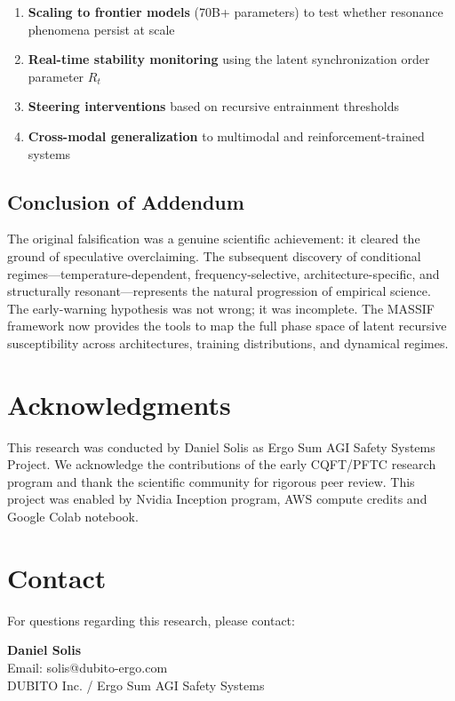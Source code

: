 \documentclass[12pt,a4paper]{article}
\begin{document}
\begin{enumerate}
    \item \textbf{Scaling to frontier models} (70B+ parameters) to test whether resonance phenomena persist at scale
    \item \textbf{Real-time stability monitoring} using the latent synchronization order parameter $R_t$
    \item \textbf{Steering interventions} based on recursive entrainment thresholds
    \item \textbf{Cross-modal generalization} to multimodal and reinforcement-trained systems
\end{enumerate}

\subsection{Conclusion of Addendum}

The original falsification was a genuine scientific achievement: it cleared the ground of speculative overclaiming. The subsequent discovery of conditional regimes---temperature-dependent, frequency-selective, architecture-specific, and structurally resonant---represents the natural progression of empirical science. The early-warning hypothesis was not wrong; it was incomplete. The MASSIF framework now provides the tools to map the full phase space of latent recursive susceptibility across architectures, training distributions, and dynamical regimes.

\section*{Acknowledgments}

This research was conducted by Daniel Solis as Ergo Sum AGI Safety Systems Project. We acknowledge the contributions of the early CQFT/PFTC research program and thank the scientific community for rigorous peer review. This project was enabled by Nvidia Inception program, AWS compute credits and Google Colab notebook.

\medskip

\section*{Contact}

For questions regarding this research, please contact:

\textbf{Daniel Solis} \\
Email: solis@dubito-ergo.com \\
DUBITO Inc. / Ergo Sum AGI Safety Systems
\end{document}
